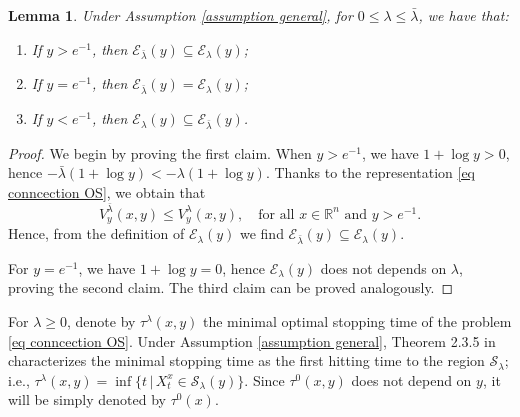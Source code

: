 \documentclass[11pt]{amsart}
\newtheorem{lemma}[theorem]{Lemma}
\theoremstyle{plain}
\def \R{\mathbb{R}}
\numberwithin{equation}{section}
\begin{document}
\begin{lemma}
    \label{lemma monotonicity boundary} 
    Under Assumption \ref{assumption general}, for $0\leq \lambda \leq \bar \lambda$, we have that:
    \begin{enumerate}
        \item If $y > e^{-1}$, then  $\mathcal E_{\bar \lambda} (y) \subseteq   \mathcal E_{ \lambda} (y)$;
        \item If $y=e^{-1}$, then $\mathcal E_{\bar \lambda}(y) = \mathcal E_{ \lambda} (y) $;
        \item If $ y<e^{-1}$, then $ \mathcal E_{ \lambda} (y) \subseteq   \mathcal E_{\bar \lambda} (y) $.
    \end{enumerate}
\end{lemma}
\begin{proof}
We begin by proving the first claim.
When $y > e^{-1}$, we have $1+\log y >0$, hence $ - \bar \lambda (1+\log y) <  - \lambda (1+\log y)$. 
Thanks to the representation \eqref{eq conncection OS}, we obtain that 
$$
V_y^{\bar \lambda} (x,y) \leq V_y^{ \lambda} (x,y), \quad \text{for all $x \in \R ^n$ and $y > e^{-1}$.}
$$
Hence, from the definition of $\mathcal E _\lambda(y)$ we find  $\mathcal E_{\bar \lambda} (y) \subseteq   \mathcal E_{ \lambda} (y)$. 

For $y = e^{-1}$, we have $1+\log y = 0$, hence $\mathcal E _\lambda(y)$ does not depends on $\lambda$, proving the second claim. 
The third claim can be proved analogously. 
\end{proof}

For $\lambda \geq 0$, denote by $\tau^\lambda (x,y)$ the minimal optimal stopping time of the problem \eqref{eq conncection OS}.
Under Assumption \ref{assumption general},  Theorem 2.3.5 in \cite{lamberton.2009optimal} characterizes  the minimal stopping time as the first hitting time to the region  ${\mathcal S_\lambda}$; i.e., $\tau^\lambda (x,y) = \inf \{ t \, | \, X_t^x \in \mathcal S _\lambda (y) \} $. 
Since $\tau^0 (x,y)$ does not depend on $y$, it will be simply denoted by $\tau^0 (x)$.
\end{document}
